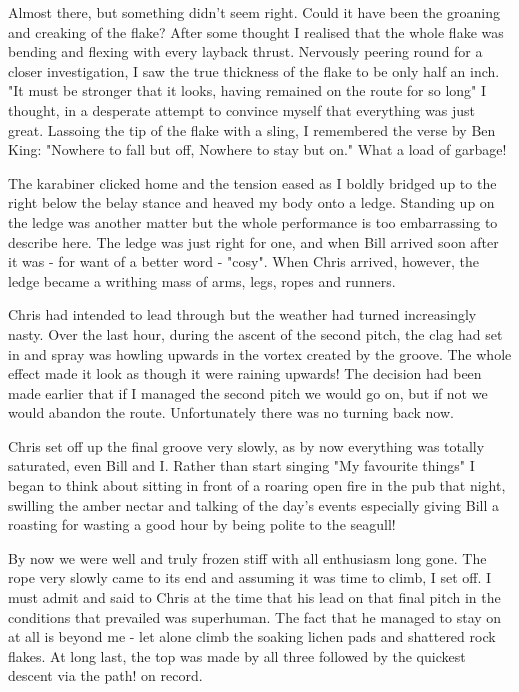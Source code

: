 \documentclass[a5paper,openany,font 10pt]{scrbook}
\begin{document}
Almost there, but something didn't seem right. Could it have
been the groaning and creaking of the flake? After some thought I
realised that the whole flake was bending and flexing with every
layback thrust. Nervously peering round for a closer
investigation, I saw the true thickness of the flake to be only
half an inch.
	"It must be stronger that it looks, having remained on the
route for so long" I thought, in a desperate attempt to convince
myself that everything was just great.  Lassoing the tip of the
flake with a sling, I remembered the verse by Ben King:
	"Nowhere to fall but off, Nowhere to stay but on."
	What a load of garbage!

The karabiner clicked home and the tension eased as I boldly
bridged up to the right below the belay stance and heaved my body
onto a ledge. Standing up on the ledge was another matter but the
whole performance is too embarrassing to describe here. The ledge
was just right for one, and when Bill arrived soon after it was -
for want of a better word - "cosy".  When Chris arrived, however,
the ledge became a writhing mass of arms, legs, ropes and
runners.

Chris had intended to lead through but the weather had
turned increasingly nasty. Over the last hour, during the ascent
of the second pitch, the clag had set in and spray was howling
upwards in the vortex created by the groove. The whole effect
made it look as though it were raining upwards!  The decision had
been made earlier that if I managed the second pitch we would go
on, but if not we would abandon the route. Unfortunately there
was no turning back now.

Chris set off up the final groove very slowly, as by now
everything was totally saturated, even Bill and I. Rather than
start singing "My favourite things" I began to think about
sitting in front of a roaring open fire in the pub that night,
swilling the amber nectar and talking of the day's events
especially giving Bill a roasting for wasting a good hour by
being polite to the seagull!

By now we were well and truly frozen stiff with all
enthusiasm long gone. The rope very slowly came to its end and
assuming it was time to climb, I set off. I must admit and said
to Chris at the time that his lead on that final pitch in the
conditions that prevailed was superhuman. The fact that he
managed to stay on at all is beyond me - let alone climb the
soaking lichen pads and shattered rock flakes.  At long last, the
top was made by all three followed by the quickest descent  via
the path!  on record.
\end{document}
